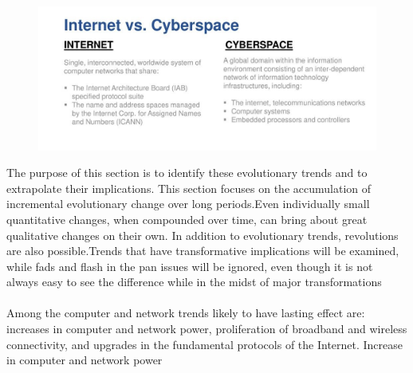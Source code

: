 \documentclass[11pt,a4paper]{article}
\begin{document}
\begin{center}
\begin{figure}[h]
			\centering
			\includegraphics[width=15 cm, height =9 cm]{diff.jpg}
\end{figure}
\end{center}



	The purpose of this section is to identify these evolutionary trends and to extrapolate their implications. This section focuses on the accumulation
of incremental evolutionary change over long periods.Even individually small quantitative changes, when compounded over time, can bring about great
qualitative changes on their own. In addition to evolutionary trends, revolutions are also possible.Trends that have transformative implications will be examined, while fads and flash in the pan issues will be ignored, even though it is not always easy to see the difference while in the midst of major transformations\\

\\

	Among the computer and network trends likely to have lasting effect are: increases in computer and network power, proliferation of broadband and wireless
connectivity, and upgrades in the fundamental protocols of the Internet.
Increase in computer and network power\\
 
\end{document}

